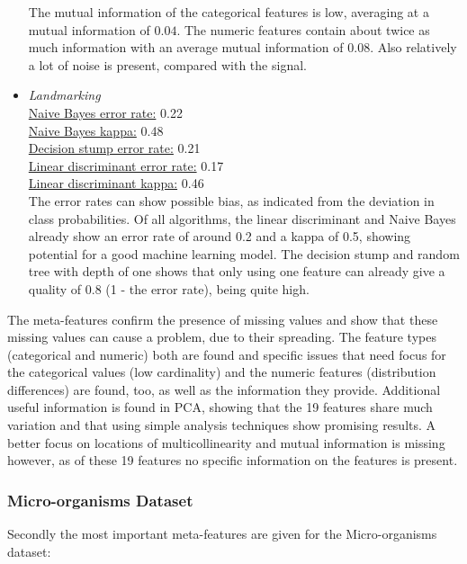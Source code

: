 \documentclass[10pt,a4paper]{report}
\begin{document}
\begin{itemize}
		The mutual information of the categorical features is low, averaging at a mutual information of $0.04$. The numeric features contain about twice as much information with an average mutual information of $0.08$. Also relatively a lot of noise is present, compared with the signal. 
		
		\item \textit{Landmarking} \\
		\underline{Naive Bayes error rate:} 0.22 \\
		\underline{Naive Bayes kappa:} 0.48 \\
		\underline{Decision stump error rate:} 0.21 \\
		\underline{Linear discriminant error rate:} 0.17 \\
		\underline{Linear discriminant kappa:} 0.46 \\  
		
		The error rates can show possible bias, as indicated from the deviation in class probabilities. Of all algorithms, the linear discriminant and Naive Bayes already show an error rate of around 0.2 and a kappa of 0.5, showing potential for a good machine learning model. The decision stump and random tree with depth of one shows that only using one feature can already give a quality of 0.8 (1 - the error rate), being quite high.
	\end{itemize}
	
	The meta-features confirm the presence of missing values and show that these missing values can cause a problem, due to their spreading. The feature types (categorical and numeric) both are found and specific issues that need focus for the categorical values (low cardinality) and the numeric features (distribution differences) are found, too, as well as the information they provide. Additional useful information is found in PCA, showing that the 19 features share much variation and that using simple analysis techniques show promising results. A better focus on locations of multicollinearity and mutual information is missing however, as of these 19 features no specific information on the features is present.
	
	\subsubsection{Micro-organisms Dataset}
	\label{DEsubsec:ExistingResultMO}
	
	Secondly the most important meta-features are given for the Micro-organisms dataset:
	
\end{document}
